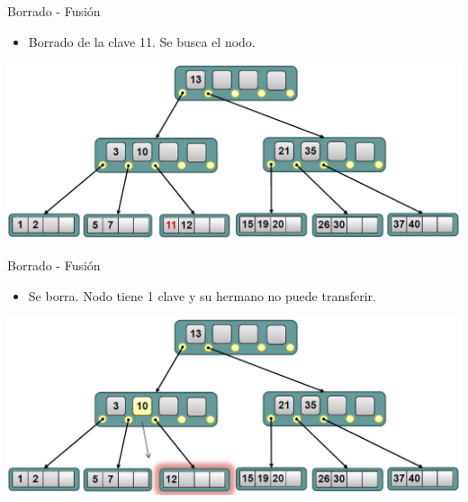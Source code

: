 \documentclass[handout]{beamer} %
\begin{document}
\begin{frame}{Borrado - Fusión}
    \begin{itemize}
        \item Borrado de la clave 11. Se busca el nodo.
    \end{itemize}
    \begin{center}
        \includegraphics[width=\textwidth]{./image/cap3/b-tree-delete8}
    \end{center}
\end{frame}

\begin{frame}{Borrado - Fusión}
    \begin{itemize}
        \item Se borra. Nodo tiene 1 clave y su hermano no puede transferir.
    \end{itemize}
    \begin{center}
        \includegraphics[width=\textwidth]{./image/cap3/b-tree-delete9}
    \end{center}
\end{frame}
\end{document}
